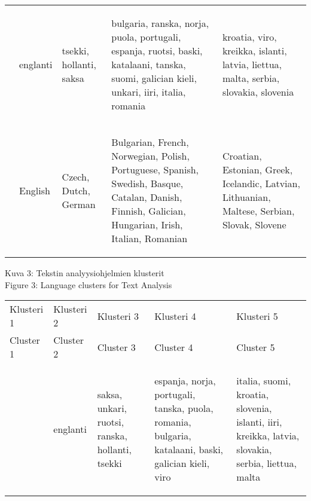 \documentclass[]{../../metanetpaper}
\begin{document}
\begin{Parallel}[c]{77mm}{77mm}
\begin{center}
\begin{tabular}{|p{2cm}|p{2cm}|p{2cm}|p{4cm}|p{4cm}|}
&
   \begin{center}
                                   englanti
   \end{center}
&
   \begin{center}
tsekki, hollanti, saksa
   \end{center}
&
   \begin{center}
bulgaria, ranska, norja, puola, portugali, espanja, ruotsi, baski, katalaani,
tanska, suomi, galician kieli, unkari, iiri, italia, romania
   \end{center}
&
   \begin{center}
kroatia, viro, kreikka, islanti, latvia, liettua, malta, serbia, slovakia,
slovenia
   \end{center}
\\
&
   \begin{center}
                                    English
   \end{center}
&
   \begin{center}
Czech, Dutch, German
   \end{center}
&
   \begin{center}
Bulgarian, French, Norwegian, Polish, Portuguese, Spanish, Swedish, Basque,
Catalan, Danish, Finnish, Galician, Hungarian, Irish, Italian, Romanian
   \end{center}
&
   \begin{center}
Croatian, Estonian, Greek, Icelandic, Latvian, Lithuanian, Maltese, Serbian,
Slovak, Slovene
   \end{center}
\end{tabular}

             Kuva 3: Tekstin analyysiohjelmien klusterit \\
                 Figure 3: Language clusters for Text Analysis
\end{center}

\begin{center}
\begin{tabular}{|p{2cm}|p{2cm}|p{2cm}|p{4cm}|p{4cm}|}
Klusteri 1 & Klusteri 2 & Klusteri 3 & Klusteri 4 & Klusteri 5 \\
Cluster 1  & Cluster 2  & Cluster 3  & Cluster 4  & Cluster 5 \\ \hline

&
   \begin{center}
                                   englanti
   \end{center}
&
   \begin{center}
saksa, unkari, ruotsi, ranska, hollanti, tsekki
   \end{center}
&
   \begin{center}
espanja, norja, portugali, tanska, puola, romania, bulgaria, katalaani, baski,
galician kieli, viro
   \end{center}
&
   \begin{center}
italia, suomi, kroatia, slovenia, islanti, iiri, kreikka, latvia, slovakia,
serbia, liettua, malta
   \end{center}
\\


\end{tabular}
\end{center}
\end{Parallel}
\end{document}
